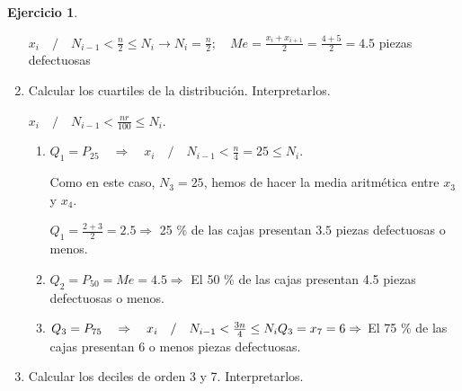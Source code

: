 \documentclass[a4paper, 12pt]{article}
\theoremstyle{definition}
\newtheorem{ej}{Ejercicio}
\begin{document}
\begin{ej}
\begin{enumerate}[label=\textit{\alph*)}]
    
    \(x_i\quad/\quad N_{i-1} < \frac{n}{2} \leq N_i \rightarrow N_i = \frac{n}{2}; \quad Me = \frac{x_i+x_{i+1}}{2}=\frac{4+5}{2} = 4.5 \) piezas defectuosas
    
    \item Calcular los cuartiles de la distribución.  Interpretarlos.
    
    \begin{center}
    \end{center}
    
    
    \(x_i\quad/\quad N_{i-1} <\frac{nr}{100} \leq N_i\).
    
    \begin{enumerate}[label=]
    \item \(Q_1 = P_{25} \quad \Rightarrow \quad x_i\quad/\quad N_{i-1} <\frac{n}{4} = 25 \leq N_i\).
    
    Como en este caso, \(N_3 = 25\), hemos de hacer la media aritmética entre \(x_3\) y \(x_4\).
    
    \(Q_1 = \frac{2+3}{2} = 2.5 \Rightarrow\) 25 \% de las cajas presentan \(3.5\) piezas defectuosas o menos. \\
    \item \(Q_2 = P_{50} = Me = 4.5 \Rightarrow\) El 50 \% de las cajas presentan 4.5 piezas defectuosas o menos. \\
     \item \(Q_3 = P_{75}\quad \Rightarrow \quad x_i\quad/\quad N_{i-1} < \frac{3n}{4}\leq N_i\\Q_3 = x_7 = 6 \Rightarrow\) El 75 \% de las cajas presentan 6 o menos piezas defectuosas.
    \end{enumerate}
    
    \newpage
    
    \item Calcular los deciles de orden 3 y 7. Interpretarlos. 
    

\end{enumerate}
\end{ej}
\end{document}

